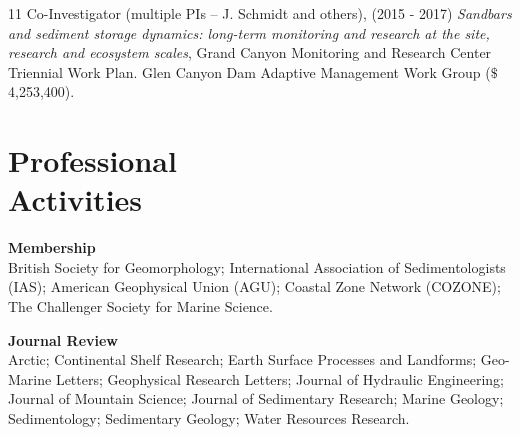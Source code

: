 \documentclass[margin,line]{resume}
\begin{document}
\begin{resume}
\begin{footnotesize}
\begin{list1}
	\item[11] Co-Investigator (multiple PIs – J. Schmidt and others), (2015 - 2017) {\sl Sandbars and sediment storage dynamics: long-term monitoring and research at the site, research and ecosystem scales}, Grand Canyon Monitoring and Research Center Triennial Work Plan. Glen Canyon Dam Adaptive Management Work Group ($\$$4,253,400).

	\end{list1}
        \end{footnotesize}

    \section{\mysidestyle Professional \\Activities}
    \begin{footnotesize} 
    {\bf Membership}\\
    British Society for Geomorphology; International Association of Sedimentologists (IAS); American Geophysical Union (AGU); Coastal Zone Network (COZONE); The Challenger Society for Marine Science.

    {\bf Journal Review} \\
 	Arctic; Continental Shelf Research; Earth Surface Processes and Landforms; Geo-Marine Letters; Geophysical Research Letters; Journal of Hydraulic Engineering; Journal of Mountain Science; Journal of Sedimentary Research; Marine Geology; Sedimentology; Sedimentary Geology; Water Resources Research.
     \end{footnotesize}


\end{resume}
\end{document}
